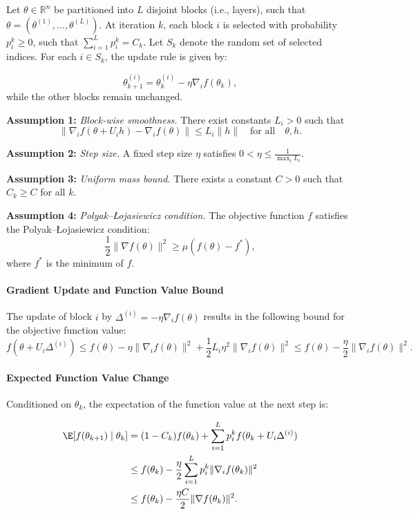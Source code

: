 Let \(\theta \in \mathbb{R}^n\) be partitioned into \(L\) disjoint blocks (i.e., layers), such that \(\theta = (\theta^{(1)}, \dots, \theta^{(L)})\). At iteration \(k\), each block \(i\) is selected with probability \(p_i^k \ge 0\), such that \(\sum_{i=1}^L p_i^k = C_k\). Let \(S_k\) denote the random set of selected indices. For each \(i \in S_k\), the update rule is given by:

\[
\theta_{k+1}^{(i)} = \theta_k^{(i)} - \eta \nabla_i f(\theta_k),
\]
while the other blocks remain unchanged.

\textbf{Assumption 1:} \textit{Block-wise smoothness.} There exist constants \(L_i > 0\) such that
\[
\|\nabla_i f(\theta + U_i h) - \nabla_i f(\theta)\| \le L_i \|h\| \quad \text{for all} \quad \theta, h.
\]

\textbf{Assumption 2:} \textit{Step size.} A fixed step size \(\eta\) satisfies \(0 < \eta \le \frac{1}{\max_i L_i}\).

\textbf{Assumption 3:} \textit{Uniform mass bound.} There exists a constant \(C > 0\) such that \(C_k \ge C\) for all \(k\).

\textbf{Assumption 4:} \textit{Polyak–Łojasiewicz condition.} The objective function \(f\) satisfies the Polyak–Łojasiewicz condition:
\[
\frac{1}{2} \|\nabla f(\theta)\|^2 \ge \mu (f(\theta) - f^*),
\]
where \(f^*\) is the minimum of \(f\).

\paragraph{Gradient Update and Function Value Bound}

The update of block \(i\) by \(\Delta^{(i)} = -\eta \nabla_i f(\theta)\) results in the following bound for the objective function value:
\[
f(\theta + U_i \Delta^{(i)}) \le f(\theta) - \eta \|\nabla_i f(\theta)\|^2 + \frac{1}{2} L_i \eta^2 \|\nabla_i f(\theta)\|^2 \le f(\theta) - \frac{\eta}{2} \|\nabla_i f(\theta)\|^2.
\]

\paragraph{Expected Function Value Change}

Conditioned on \(\theta_k\), the expectation of the function value at the next step is:

\[
\begin{aligned}
\E[f(\theta_{k+1}) \mid \theta_k] 
&= (1 - C_k) f(\theta_k) + \sum_{i=1}^L p_i^k f(\theta_k + U_i \Delta^{(i)}) \\
&\le f(\theta_k) - \frac{\eta}{2} \sum_{i=1}^L p_i^k \|\nabla_i f(\theta_k)\|^2 \\
&\le f(\theta_k) - \frac{\eta C}{2} \|\nabla f(\theta_k)\|^2.
\end{aligned}
\]


